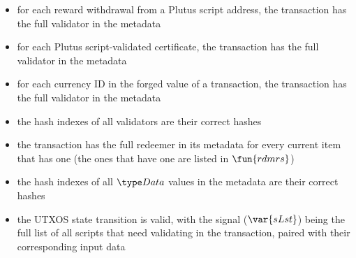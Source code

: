 \begin{itemize}
  \item for each reward withdrawal from a Plutus script address, the transaction
  has the full validator in the metadata

  \item for each Plutus script-validated certificate, the transaction
  has the full validator in the metadata

  \item for each currency ID in the forged value of a transaction, the transaction
  has the full validator in the metadata

  \item the hash indexes of all validators are their correct hashes

  \item the transaction has the full redeemer in its metadata for every current
  item that has one (the ones that have one are listed in $\fun{rdmrs}$)

  \item the hash indexes of all $\Data$ values in the metadata are their correct hashes

  \item the UTXOS state transition is valid, with the signal ($\var{sLst}$) being
  the full list of all scripts that need validating in the transaction, paired with
  their corresponding input data
\end{itemize}


